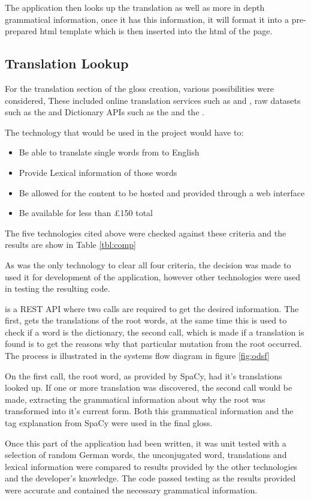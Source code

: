The application then looks up the translation as well as more in depth grammatical information, once it has this information, it will format it into a pre-prepared html template which is then inserted into the html of the page.

\subsection{Translation Lookup}

For the translation section of the gloss creation, various possibilities were considered, These included online translation services such as \textcite{googletranslate} and \textcite{bingtranslate}, raw datasets such as the \textcite{dictCC} and Dictionary APIs such as the \textcite{oxford} and the \textcite{collins}. 

The technology that would be used in the project would have to:
\begin{itemize}
\item Be able to translate single words from to English
\item Provide Lexical information of those words
\item Be allowed for the content to be hosted and provided through a web interface
\item Be available for less than \pounds150 total
\end{itemize}

The five technologies cited above were checked against these criteria and the results are show in Table \ref{tbl:comp}



As \textcite{oxford} was the only technology to clear all four criteria, the decision was made to used it for development of the application, however other technologies were used in testing the resulting code.

\textcite{oxford} is a REST API where two calls are required to get the desired information. The first, gets the translations of the root words, at the same time this is used to check if a word is the dictionary, the second call, which is made if a translation is found is to get the reasons why that particular mutation from the root occurred.  The process is illustrated in the systems flow diagram in figure \ref{fig:odsf}



On the first call, the root word, as provided by SpaCy, had it's translations looked up. If one or more translation was discovered, the second call would be made, extracting the grammatical information about why the root was transformed into it's current form. Both this grammatical information and the tag explanation from SpaCy were used in the final gloss.

Once this part of the application had been written, it was unit tested with a selection of random German words, the unconjugated word, translations and lexical information were compared to results provided by the other technologies and the developer's knowledge. The code passed testing as the results provided were accurate and contained the necessary grammatical information. 
	